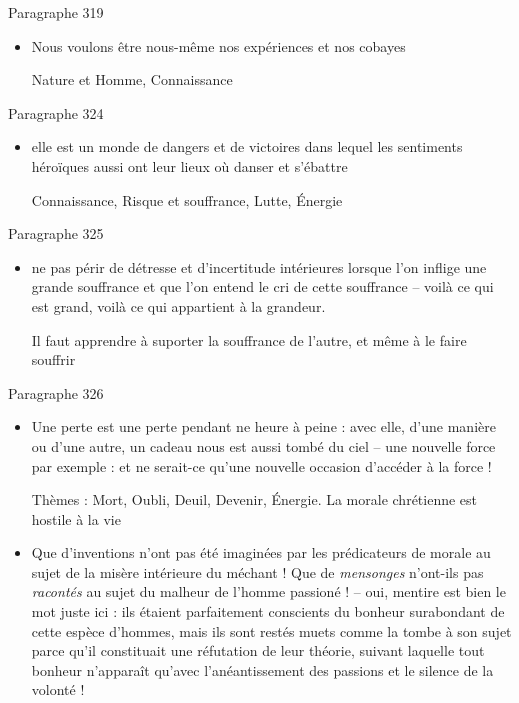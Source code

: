 \documentclass[french,a4paper,11pt,answers]{exam}
\newcommand{\cit}[2]{\og #1 \fg{} \begin{solution}{ #2 }\end{solution}} %
\begin{document}
	\begin{cadre}{Paragraphe 319}
		\begin{itemize}
			\item \cit{Nous voulons être nous-même nos expériences et nos cobayes}
				{Nature et Homme, Connaissance}
		\end{itemize}
	\end{cadre}
	
	\begin{cadre}{Paragraphe 324}
		\begin{itemize}
			\item \cit{elle est un monde de dangers et de victoires dans lequel les sentiments héroïques aussi ont leur lieux où danser et s'ébattre}
				{Connaissance, Risque et souffrance, Lutte, Énergie}
		\end{itemize}
	\end{cadre}

	\begin{cadre}{Paragraphe 325}
		\begin{itemize}
			\item \cit{ne pas périr de détresse et d'incertitude intérieures lorsque l'on inflige une grande souffrance et que l'on entend le cri de cette souffrance -- voilà ce qui est grand, voilà ce qui appartient à la grandeur.}
				{Il faut apprendre à suporter la souffrance de l'autre, et même à le faire souffrir}
		\end{itemize}
	\end{cadre}
	
	\begin{cadre}{Paragraphe 326}
		\begin{itemize}
			\item \cit{Une perte est une perte pendant ne heure à peine : avec elle, d'une manière ou d'une autre, un cadeau nous est aussi tombé du ciel -- une nouvelle force par exemple : et ne serait-ce qu'une nouvelle occasion d'accéder à la force !}
				{Thèmes : Mort, Oubli, Deuil, Devenir, Énergie. La morale chrétienne est hostile à la vie}
			\item \cit{Que d'inventions n'ont pas été imaginées par les prédicateurs de morale au sujet de la \og misère \fg{} intérieure du méchant ! Que de \emph{mensonges} n'ont-ils pas \emph{racontés} au sujet du malheur de l'homme passioné ! -- oui, mentire est bien le mot juste ici : ils étaient parfaitement conscients du bonheur surabondant de cette espèce d'hommes, mais ils sont restés muets comme la tombe à son sujet parce qu'il constituait une réfutation de leur théorie, suivant laquelle tout bonheur n'apparaît qu'avec l'anéantissement des passions et le silence de la volonté !}
				{}
		\end{itemize}
	\end{cadre}
\end{document}
